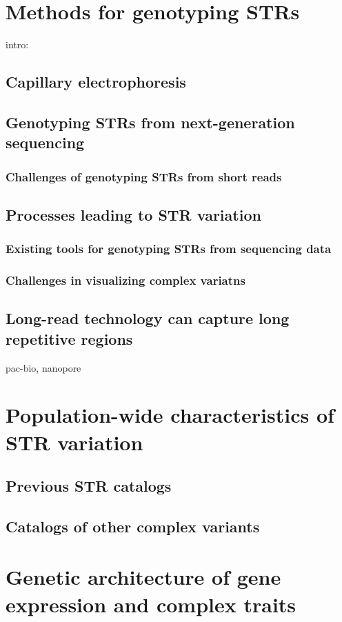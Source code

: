 \section{Methods for genotyping STRs}
\label{sec:intromethods}
intro:
\subsection{Capillary electrophoresis}
\subsection{Genotyping STRs from next-generation sequencing}
\subsubsection{Challenges of genotyping STRs from short reads}
\subsection{Processes leading to STR variation}
\subsubsection{Existing tools for genotyping STRs from sequencing data}
\subsubsection{Challenges in visualizing complex variatns}
\subsection{Long-read technology can capture long repetitive regions}
pac-bio, nanopore

\section{Population-wide characteristics of STR variation}
\subsection{Previous STR catalogs}
\subsection{Catalogs of other complex variants}

\section{Genetic architecture of gene expression and complex traits}
\label{sec:introarch}
